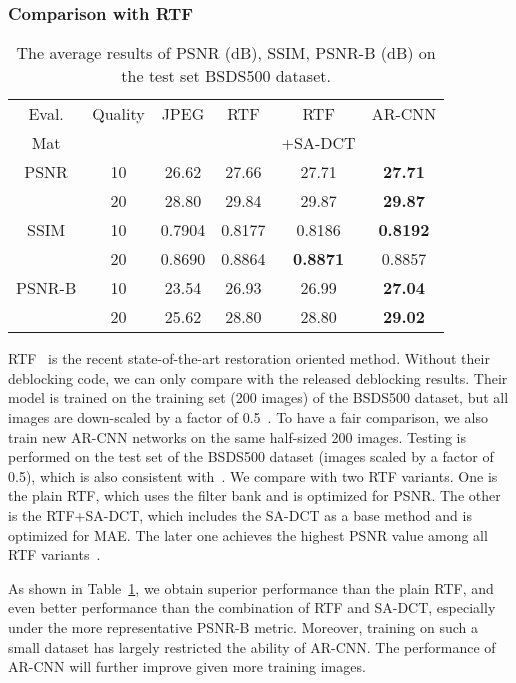 \documentclass[10pt,twocolumn,letterpaper]{article}
\begin{document}
\subsubsection{Comparison with RTF}

\begin{table}\scriptsize
\caption{The average results of PSNR (dB), SSIM, PSNR-B (dB) on the test set BSDS500 dataset.}\label{tab:rtf}
\vspace{-0.15cm}
\begin{center}
\begin{tabular}{|c|c|c|c|c|c|}
\hline
 Eval. & Quality & JPEG & RTF & RTF & AR-CNN \\
Mat &            &      &     & +SA-DCT&    \\
\hline\hline
PSNR & 10 & 26.62 & 27.66 & 27.71 & \textbf{27.71}   \\
     & 20 & 28.80 & 29.84 & 29.87 &\textbf{29.87}   \\
\hline\hline
SSIM & 10 & 0.7904 & 0.8177 & 0.8186 & \textbf{0.8192}   \\
     & 20 & 0.8690 & 0.8864 & \textbf{0.8871} & 0.8857   \\
\hline\hline
PSNR-B & 10 & 23.54 & 26.93 & 26.99 & \textbf{27.04}   \\
     & 20 & 25.62 & 28.80 & 28.80 & \textbf{29.02}  \\
\hline
\end{tabular}
\vspace{-0.65cm}
\end{center}
\end{table}

RTF~\cite{Jancsary2012} is the recent state-of-the-art restoration oriented method. Without their deblocking code, we can only compare with the released deblocking results. Their model is trained on the training set (200 images) of the BSDS500 dataset, but all images are down-scaled by a factor of 0.5~\cite{Jancsary2012}. To have a fair comparison, we also train new AR-CNN networks on the same half-sized 200 images. Testing is performed on the test set of the BSDS500 dataset (images scaled by a factor of 0.5), which is also consistent with~\cite{Jancsary2012}. We compare with two RTF variants. One is the plain RTF, which uses the filter bank and is optimized for PSNR. The other is the RTF+SA-DCT, which includes the SA-DCT as a base method and is optimized for MAE. The later one achieves the highest PSNR value among all RTF variants~\cite{Jancsary2012}.

As shown in Table~\ref{tab:rtf}, we obtain superior performance than the plain RTF, and even better performance than the combination of RTF and SA-DCT, especially under the more representative PSNR-B metric.
Moreover, training on such a small dataset has largely restricted the ability of AR-CNN. The performance of AR-CNN will further improve given more training images.
\end{document}
